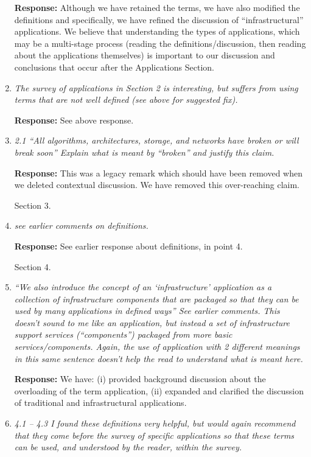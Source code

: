 \documentclass{article}
\begin{document}
\begin{enumerate}
\textbf{Response:} Although we have retained the terms, we have also modified the definitions and specifically, we have refined the discussion of ``infrastructural'' applications.  We believe that
understanding the types of applications, which may be a multi-stage process (reading the definitions/discussion, then reading about the applications themselves) is important to our discussion and conclusions that occur after the Applications Section.

\item \emph{The survey of applications in Section 2 is interesting, but suffers from using terms that are not well defined (see above for suggested fix).}

\textbf{Response:} See above response.

\item \emph{2.1 ``All algorithms, architectures, storage, and networks have broken or will break soon'' Explain what is meant by ``broken'' and justify this claim.}

  \textbf{Response:} This was a legacy remark which should have been removed when we deleted contextual discussion. We have removed this over-reaching claim.

\hspace{-0.7cm}Section 3.

\item \emph{see earlier comments on definitions.}

\textbf{Response:} See earlier response about definitions, in point 4.

\hspace{-0.7cm}Section 4.

\item \emph{``We also introduce the concept of an `infrastructure' application as a collection of infrastructure components that are packaged so that they can be used by many applications in defined ways'' See earlier comments. This doesn't sound to me like an application, but instead a set of infrastructure support services (``components'') packaged from more basic services/components. Again, the use of application with 2 different meanings in this same sentence doesn't help the read to understand what is meant here.}

  \textbf{Response:} We have: (i) provided background discussion about the overloading of the term application, (ii) expanded and clarified the discussion of traditional and infrastructural applications.

\item \emph{4.1 -- 4.3 I found these definitions very helpful, but would again recommend that they come before the survey of specific applications so that these terms can be used, and understood by the reader, within the survey.}


\end{enumerate}
\end{document}
